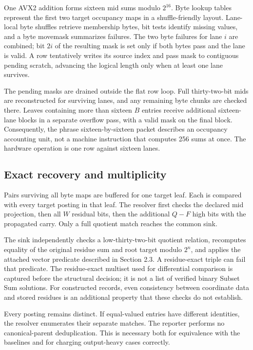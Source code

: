 \documentclass[manuscript,screen,review]{acmart}
\begin{document}
One AVX2 addition forms sixteen mid sums modulo $2^{16}$. Byte lookup tables represent the first two target occupancy maps in a shuffle-friendly layout. Lane-local byte shuffles retrieve membership bytes, bit tests identify missing values, and a byte movemask summarizes failures. The two byte failures for lane $i$ are combined; bit $2i$ of the resulting mask is set only if both bytes pass and the lane is valid. A row tentatively writes its source index and pass mask to contiguous pending scratch, advancing the logical length only when at least one lane survives.

The pending masks are drained outside the flat row loop. Full thirty-two-bit mids are reconstructed for surviving lanes, and any remaining byte chunks are checked there. Leaves containing more than sixteen $B$ entries receive additional sixteen-lane blocks in a separate overflow pass, with a valid mask on the final block. Consequently, the phrase sixteen-by-sixteen packet describes an occupancy accounting unit, not a machine instruction that computes 256 sums at once. The hardware operation is one row against sixteen lanes.

\subsection{Exact recovery and multiplicity}
Pairs surviving all byte maps are buffered for one target leaf. Each is compared with every target posting in that leaf. The resolver first checks the declared mid projection, then all $W$ residual bits, then the additional $Q-F$ high bits with the propagated carry. Only a full quotient match reaches the common sink.

The sink independently checks a low-thirty-two-bit quotient relation, recomputes equality of the original residue sum and root target modulo $2^n$, and applies the attached vector predicate described in Section 2.3. A residue-exact triple can fail that predicate. The residue-exact multiset used for differential comparison is captured before the structural decision; it is not a list of verified binary Subset Sum solutions. For constructed records, even consistency between coordinate data and stored residues is an additional property that these checks do not establish.

Every posting remains distinct. If equal-valued entries have different identities, the resolver enumerates their separate matches. The reporter performs no canonical-parent deduplication. This is necessary both for equivalence with the baselines and for charging output-heavy cases correctly.
\end{document}
